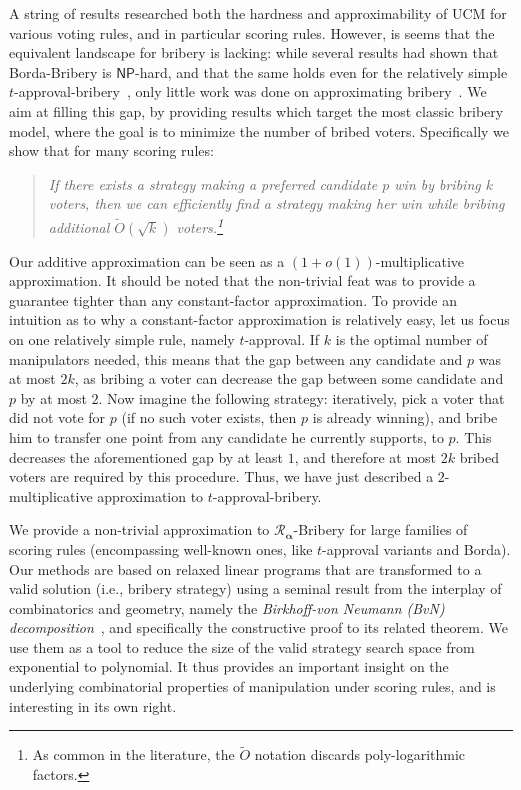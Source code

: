 \documentclass[letterpaper]{article} %
\theoremstyle{definition}
\newcommand\vecgreek{\bm}
\newcommand{\veca}{\vecgreek{\alpha}}
\newcommand{\Ra}{\mathcal{R}_{\veca}}
\newcommand{\NP}{\mathsf{NP}}
\begin{document}
A string of results researched both the hardness and approximability of UCM for various voting rules, and in particular scoring rules. However, is seems that the equivalent landscape for bribery is lacking: while several results had shown that Borda-Bribery is $\NP$-hard, and that the same holds even for the relatively simple $t$-approval-bribery~\cite{DBLP:journals/jair/FaliszewskiHH09,DBLP:conf/aaai/BrelsfordFHSS08,lin2012solving,DBLP:conf/aaai/BredereckFNT16,DBLP:journals/iandc/BredereckCFNN16}, only little work was done on approximating bribery~\cite{DBLP:conf/atal/Faliszewski08,DBLP:conf/wine/ElkindF10,DBLP:journals/iandc/BredereckCFNN16}. We aim at filling this gap, by providing  results which target the most classic bribery model, where the goal is to minimize the number of bribed voters. Specifically we show that for many scoring rules:
\begin{quotation}
	\emph{If there exists a strategy making a preferred candidate $p$ win by bribing $k$ voters, then we can \emph{efficiently} find a strategy making her win while bribing additional $\widetilde{O}(\sqrt{k})$ voters.\footnote{As common in the literature, the $\widetilde{O}$ notation discards poly-logarithmic factors.}}
\end{quotation}

Our additive approximation can be seen as a $(1+o(1))$-multiplicative approximation. It should be noted that the non-trivial feat was to provide a guarantee tighter than any constant-factor approximation. To provide an intuition as to why a constant-factor approximation is relatively easy, let us focus on one relatively simple rule, namely $t$-approval. 
If $k$ is the optimal number of manipulators needed, this means that the gap between any candidate and $p$ was at most $2k$, as bribing a voter can decrease the gap between some candidate and $p$ by at most $2$. Now imagine the following strategy: iteratively, pick a voter that did not vote for $p$ (if no such voter exists, then $p$ is already winning), and bribe him to transfer one point from any candidate he currently supports, to $p$. This decreases the aforementioned gap by at least $1$, and therefore at most $2k$ bribed voters are required by this procedure. Thus, we have just described a $2$-multiplicative approximation to $t$-approval-bribery.
 


We provide a non-trivial approximation to $\Ra$-Bribery for large families of scoring rules (encompassing  well-known ones, like $t$-approval variants and Borda). Our methods are based on  relaxed linear programs that are transformed to a valid solution (i.e., bribery strategy) using a seminal result from the interplay of combinatorics and geometry, namely the \emph{Birkhoff-von Neumann (BvN) decomposition}~\cite{birkhoff1946tres,von1953certain,konig2001theorie}, and specifically the constructive proof to its related theorem. We use them as a tool to reduce the size of the valid strategy search space from exponential to polynomial. It thus provides an important insight on the underlying combinatorial properties of manipulation under scoring rules, and is interesting in its own right.
\end{document}
